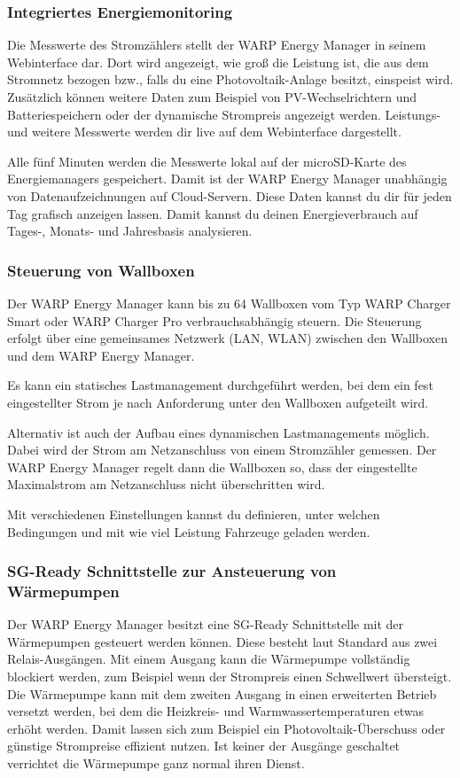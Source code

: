 \documentclass[a4paper,10pt]{article}
\begin{document}
\begin{multicols*}{2}
	\subsubsection{Integriertes Energiemonitoring}
	Die Messwerte des Stromzählers stellt der WARP Energy Manager in seinem
	Webinterface dar. Dort wird angezeigt, wie groß die Leistung ist, die aus dem Stromnetz
	bezogen bzw., falls du eine Photovoltaik-Anlage besitzt, einspeist wird. Zusätzlich können
    weitere Daten zum Beispiel von PV-Wechselrichtern und Batteriespeichern oder der dynamische Strompreis
    angezeigt werden. Leistungs- und weitere Messwerte werden dir live auf dem Webinterface dargestellt.

	Alle fünf Minuten werden die Messwerte lokal auf der microSD-Karte des
	Energiemanagers gespeichert. Damit ist der WARP Energy Manager unabhängig
	von Datenaufzeichnungen auf Cloud-Servern. Diese Daten kannst du dir für jeden Tag
	grafisch anzeigen lassen. Damit kannst du deinen Energieverbrauch auf Tages-, Monats- und
	Jahresbasis analysieren.

	\subsubsection{Steuerung von Wallboxen}
	Der WARP Energy Manager kann bis zu 64 Wallboxen vom Typ WARP Charger Smart oder WARP Charger Pro verbrauchsabhängig steuern.
	Die Steuerung erfolgt über eine gemeinsames Netzwerk (LAN, WLAN) zwischen den Wallboxen und dem WARP Energy Manager.

    Es kann ein statisches Lastmanagement durchgeführt werden, bei dem ein fest eingestellter Strom je nach Anforderung
    unter den Wallboxen aufgeteilt wird. 
    
    Alternativ ist auch der Aufbau eines dynamischen Lastmanagements möglich. Dabei wird der Strom am Netzanschluss
    von einem Stromzähler gemessen. Der WARP Energy Manager regelt dann die Wallboxen so, dass der eingestellte Maximalstrom 
    am Netzanschluss nicht überschritten wird.

	Mit verschiedenen Einstellungen kannst du definieren, 
	unter welchen Bedingungen und mit wie viel Leistung Fahrzeuge geladen werden.

	\subsubsection{SG-Ready Schnittstelle zur Ansteuerung von Wärmepumpen}
    Der WARP Energy Manager besitzt eine SG-Ready Schnittstelle mit der Wärmepumpen gesteuert werden können.
    Diese besteht laut Standard aus zwei Relais-Ausgängen. Mit einem Ausgang kann die Wärmepumpe vollständig blockiert werden, 
    zum Beispiel wenn der Strompreis einen Schwellwert übersteigt. Die Wärmepumpe kann mit dem zweiten
    Ausgang in einen erweiterten Betrieb versetzt werden, bei dem die Heizkreis- und Warmwassertemperaturen etwas erhöht werden. 
    Damit lassen sich zum Beispiel ein Photovoltaik-Überschuss oder günstige Strompreise effizient nutzen. Ist keiner
    der Ausgänge geschaltet verrichtet die Wärmepumpe ganz normal ihren Dienst.


\end{multicols*}
\end{document}
